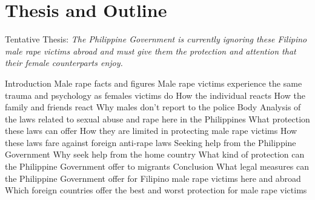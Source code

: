 \section{Thesis and Outline}
Tentative Thesis:\textit{ The Philippine Government is currently ignoring these Filipino male rape victims abroad and must give them the protection and attention that their female counterparts enjoy.}
\begin{outline}[enumerate]
	\1 Introduction
	\2 Male rape facts and figures
	\2 Male rape victims experience the same trauma and psychology as females victims do
	\3 How the individual reacts
	\3 How the family and friends react
	\3 Why males don't report to the police
	\1 Body
	\2 Analysis of the laws related to sexual abuse and rape here in the Philippines
	\3 What protection these laws can offer
	\3 How they are limited in protecting male rape victims
	\3 How these laws fare against foreign anti-rape laws
	\2 Seeking help from the Philippine Government
	\3 Why seek help from the home country
	\3 What kind of protection can the Philippine Government offer to migrants
	\1 Conclusion
	\2 What legal measures can the Philippine Government offer for Filipino male rape victims here and abroad
	\2 Which foreign countries offer the best and worst protection for male rape victims
\end{outline}
